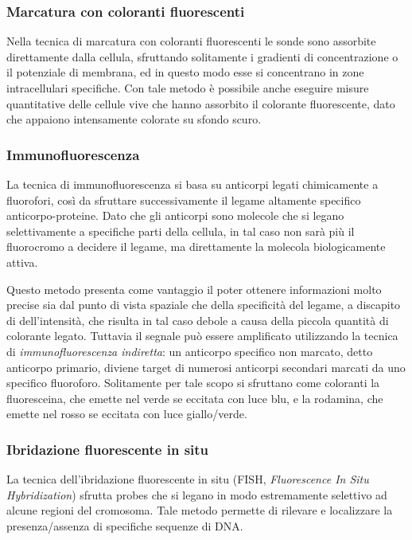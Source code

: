 \subsubsection*{Marcatura con coloranti fluorescenti}
Nella tecnica di marcatura con coloranti fluorescenti le sonde sono assorbite direttamente dalla cellula, sfruttando solitamente i gradienti di concentrazione o il potenziale di membrana, ed in questo modo esse si concentrano in zone intracellulari specifiche.
Con tale metodo è possibile anche eseguire misure quantitative delle cellule vive che hanno assorbito il colorante fluorescente, dato che appaiono intensamente colorate su sfondo scuro. 

\subsubsection*{Immunofluorescenza}
La tecnica di immunofluorescenza si basa su anticorpi legati chimicamente a fluorofori, così da sfruttare successivamente il legame altamente specifico anticorpo-proteine. 
Dato che gli anticorpi sono molecole che si legano selettivamente a specifiche parti della cellula, in tal caso non sarà più il fluorocromo a decidere il legame, ma direttamente la molecola biologicamente attiva.

Questo metodo presenta come vantaggio il poter ottenere informazioni molto precise sia dal punto di vista spaziale che della specificità del legame, a discapito di dell'intensità, che risulta in tal caso debole a causa della piccola quantità di colorante legato.
Tuttavia il segnale può essere amplificato utilizzando la tecnica di \textit{immunofluorescenza indiretta}: un anticorpo specifico non marcato, detto anticorpo primario, diviene target di numerosi anticorpi secondari marcati da uno specifico fluoroforo. 
Solitamente per tale scopo si sfruttano come coloranti la fluoresceina, che emette nel verde se eccitata con luce blu, e la rodamina, che emette nel rosso se eccitata con luce giallo/verde.

\subsubsection*{Ibridazione fluorescente in situ}
La tecnica dell'ibridazione fluorescente in situ (FISH, \textit{Fluorescence In Situ Hybridization}) sfrutta probes che si legano in modo estremamente selettivo ad alcune regioni del cromosoma. 
Tale metodo permette di rilevare e localizzare la presenza/assenza di specifiche sequenze di DNA.


